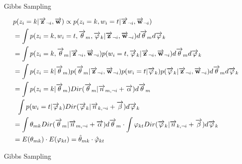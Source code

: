 \documentclass{beamer}
\begin{document}
\begin{CJK*}{UTF8}{gbsn}
\begin{frame}{Gibbs Sampling}
\begin{small}
\begin{align*}
&p(z_i = k|\overrightarrow{\mathbf{z}}_{\neg i}, \overrightarrow{\mathbf{w}}) \propto
p(z_i = k, w_i = t |\overrightarrow{\mathbf{z}}_{\neg i}, \overrightarrow{\mathbf{w}}_{\neg i}) \\
&= \int p(z_i = k, w_i = t, \overrightarrow{\theta}_m,\overrightarrow{\varphi}_k |
\overrightarrow{\mathbf{z}}_{\neg i}, \overrightarrow{\mathbf{w}}_{\neg i}) d \overrightarrow{\theta}_m d \overrightarrow{\varphi}_k \\
&= \int p(z_i = k, \overrightarrow{\theta}_m|\overrightarrow{\mathbf{z}}_{\neg i}, \overrightarrow{\mathbf{w}}_{\neg i})
p(w_i = t, \overrightarrow{\varphi}_k | \overrightarrow{\mathbf{z}}_{\neg i}, \overrightarrow{\mathbf{w}}_{\neg i})
d \overrightarrow{\theta}_m d \overrightarrow{\varphi}_k \\
&= \int p(z_i = k |\overrightarrow{\theta}_m) p(\overrightarrow{\theta}_m|\overrightarrow{\mathbf{z}}_{\neg i}, \overrightarrow{\mathbf{w}}_{\neg i})
 p(w_i = t |\overrightarrow{\varphi}_k) p(\overrightarrow{\varphi}_k|\overrightarrow{\mathbf{z}}_{\neg i}, \overrightarrow{\mathbf{w}}_{\neg i})d \overrightarrow{\theta}_m d \overrightarrow{\varphi}_k \\
&= \int p(z_i = k |\overrightarrow{\theta}_m) Dir(\overrightarrow{\theta}_m| \overrightarrow{n}_{m,\neg i} + \overrightarrow{\alpha}) d \overrightarrow{\theta}_m \\
& \hspace{0.2cm} \int p(w_i = t |\overrightarrow{\varphi}_k) Dir( \overrightarrow{\varphi}_k| \overrightarrow{n}_{k,\neg i} + \overrightarrow{\beta}) d \overrightarrow{\varphi}_k \\
&= \int \theta_{mk} Dir(\overrightarrow{\theta}_m| \overrightarrow{n}_{m,\neg i} + \overrightarrow{\alpha}) d \overrightarrow{\theta}_m
\cdot \int \varphi_{kt} Dir( \overrightarrow{\varphi}_k| \overrightarrow{n}_{k,\neg i} + \overrightarrow{\beta}) d \overrightarrow{\varphi}_k \\
&= E(\theta_{mk}) \cdot E(\varphi_{kt})= \hat{\theta}_{mk} \cdot \hat{\varphi}_{kt} \\
\label{gibbs-sampling-deduction}
\end{align*}
\end{small}
\end{frame}

\begin{frame}{Gibbs Sampling}
\begin{small}


\end{small}
\end{frame}
\end{CJK*}
\end{document}
